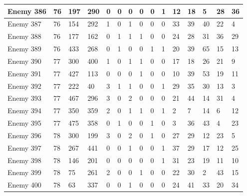 \begin{sidewaystable}[!h]
{\begin{tabular}{|l|l|l|l|l|l|l|l|l|l|l|l|l|l|l|}
			Enemy 386 & 76 & 197 & 290 & 0 & 0 & 0 & 0 & 0 & 1 & 12 & 18 & 5 & 28 & 36 \\ \hline
			Enemy 387 & 76 & 154 & 292 & 1 & 0 & 1 & 0 & 0 & 0 & 33 & 39 & 40 & 22 & 4 \\ \hline
			Enemy 388 & 76 & 177 & 162 & 0 & 1 & 1 & 1 & 0 & 0 & 24 & 28 & 31 & 36 & 29 \\ \hline
			Enemy 389 & 76 & 433 & 268 & 0 & 1 & 0 & 0 & 1 & 1 & 20 & 39 & 65 & 15 & 13 \\ \hline
			Enemy 390 & 77 & 300 & 400 & 1 & 0 & 1 & 1 & 0 & 0 & 17 & 18 & 26 & 21 & 9 \\ \hline
			Enemy 391 & 77 & 427 & 113 & 0 & 0 & 0 & 1 & 0 & 0 & 10 & 39 & 53 & 19 & 11 \\ \hline
			Enemy 392 & 77 & 222 & 40 & 3 & 1 & 1 & 0 & 0 & 1 & 29 & 35 & 30 & 13 & 3 \\ \hline
			Enemy 393 & 77 & 467 & 296 & 3 & 0 & 2 & 0 & 0 & 0 & 21 & 44 & 14 & 31 & 4 \\ \hline
			Enemy 394 & 77 & 350 & 359 & 2 & 0 & 1 & 1 & 0 & 1 & 2 & 7 & 14 & 6 & 12 \\ \hline
			Enemy 395 & 77 & 475 & 358 & 0 & 1 & 0 & 0 & 1 & 0 & 3 & 36 & 43 & 4 & 23 \\ \hline
			Enemy 396 & 78 & 300 & 199 & 3 & 0 & 2 & 0 & 1 & 0 & 27 & 29 & 12 & 23 & 5 \\ \hline
			Enemy 397 & 78 & 267 & 441 & 0 & 0 & 1 & 0 & 0 & 1 & 37 & 29 & 17 & 12 & 25 \\ \hline
			Enemy 398 & 78 & 146 & 201 & 0 & 0 & 0 & 0 & 0 & 1 & 31 & 23 & 19 & 11 & 10 \\ \hline
			Enemy 399 & 78 & 75 & 261 & 2 & 0 & 0 & 1 & 0 & 0 & 22 & 30 & 2 & 43 & 15 \\ \hline
			Enemy 400 & 78 & 63 & 337 & 0 & 0 & 1 & 0 & 0 & 0 & 24 & 41 & 33 & 20 & 34 \\ \hline
		\end{tabular}%
	}
\end{sidewaystable}
\clearpage

